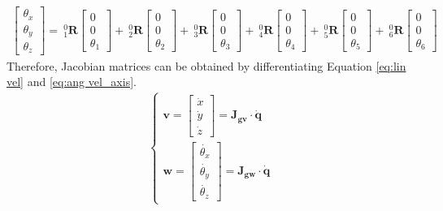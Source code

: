 \begin{equation}
\label{eq:ang vel_axis}
\begin{split}
\begin{bmatrix}
\theta _x \\
\theta _y \\
\theta _z 
\end{bmatrix}
=
\ ^0_1\mathbf{R}
\begin{bmatrix}
0 \\ 
0 \\ 
\theta _1
\end{bmatrix}
+
\ ^0_2\mathbf{R}
\begin{bmatrix}
0 \\ 
0 \\ 
\theta _2
\end{bmatrix}
+
\ ^0_3\mathbf{R}
\begin{bmatrix}
0 \\ 
0 \\ 
\theta _3
\end{bmatrix}
+
\ ^0_4\mathbf{R}
\begin{bmatrix}
0 \\ 
0 \\ 
\theta _4
\end{bmatrix}
+
\ ^0_5\mathbf{R}
\begin{bmatrix}
0 \\ 
0 \\ 
\theta _5
\end{bmatrix}
+
\ ^0_6\mathbf{R}
\begin{bmatrix}
0 \\ 
0 \\ 
\theta _6
\end{bmatrix}
\end{split}
\end{equation}
Therefore, Jacobian matrices can be obtained by differentiating Equation \ref{eq:lin vel} and \ref{eq:ang vel_axis}.
\begin{equation}
\begin{split}
\left\{\begin{matrix}
\boldsymbol{v} 
= 
\begin{bmatrix}
\dot{x}\\
\dot{y}\\
\dot{z}
\end{bmatrix}
=
\mathbf{J_{gv}} \cdot \boldsymbol{\dot{q}}
\\
\boldsymbol{w} 
= 
\begin{bmatrix}
\dot{\theta _x}\\
\dot{\theta _y}\\
\dot{\theta _z}
\end{bmatrix}
=
\mathbf{J_{gw}} \cdot \boldsymbol{\dot{q}}
\end{matrix}\right.	
\end{split}
\end{equation}
